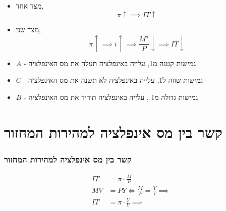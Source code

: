\documentclass[10pt,usenames,dvipsnames]{beamer}
\begin{document}
\begin{RTL}
\begin{frame}[allowframebreaks]
    \begin{itemize}
        \item מצד אחד, $$\pi \uparrow \implies IT \uparrow$$
        \item מצד שני, $$\pi \uparrow \implies i \uparrow \implies \frac{M^d}{P} \downarrow \implies IT \downarrow$$
    \end{itemize}

    \framebreak
    \begin{center}
    \end{center}
    \begin{itemize}
        \item $A$ - גמישות קטנה מ1, עלייה באינפלציה תעלה את מס האינפלציה
        \item $C$ - גמישות שווה ל1, עלייה באינפלציה לא תשנה את מס האינפלציה
        \item $B$ - גמישות גדולה מ1 , עלייה באינפלציה תוריד את מס האינפלציה
    \end{itemize}
   

    

\end{frame}

\section{קשר בין מס אינפלציה למהירות המחזור}
\begin{frame}
    \frametitle{קשר בין מס אינפלציה למהירות המחזור}
    \begin{align*}
        IT &= \pi \cdot \frac{M}{P} \\
        MV &= PY \iff \frac{M}{P} = \frac{Y}{V} \implies \\
        IT &= \pi \cdot \frac{Y}{V} \implies
    \end{align*}


\end{frame}
\end{RTL}
\end{document}
